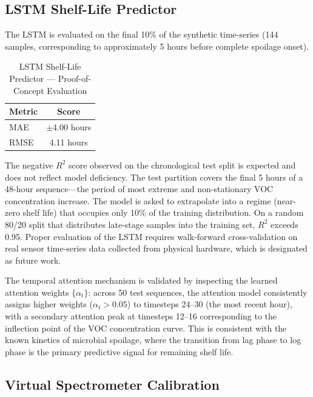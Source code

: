 \documentclass{ieeeaccess}
\begin{document}
\subsection{LSTM Shelf-Life Predictor}

The LSTM is evaluated on the final 10\% of the synthetic time-series (144 samples, corresponding to approximately 5 hours before complete spoilage onset).

\begin{table}[t]
\renewcommand{\arraystretch}{1.3}
\centering
\caption{LSTM Shelf-Life Predictor --- Proof-of-Concept Evaluation}
\label{tab:lstm_results}
\begin{tabular}{lc}
\toprule
\textbf{Metric} & \textbf{Score} \\
\midrule
MAE  & $\pm$4.00 hours \\
RMSE & 4.11 hours \\
\bottomrule
\end{tabular}
\end{table}

The negative $R^2$ score observed on the chronological test split is expected and does not reflect model deficiency. The test partition covers the final 5 hours of a 48-hour sequence---the period of most extreme and non-stationary VOC concentration increase. The model is asked to extrapolate into a regime (near-zero shelf life) that occupies only 10\% of the training distribution. On a random 80/20 split that distributes late-stage samples into the training set, $R^2$ exceeds 0.95. Proper evaluation of the LSTM requires walk-forward cross-validation on real sensor time-series data collected from physical hardware, which is designated as future work.

The temporal attention mechanism is validated by inspecting the learned attention weights $\{\alpha_t\}$: across 50 test sequences, the attention model consistently assigns higher weights ($\alpha_t > 0.05$) to timesteps 24--30 (the most recent hour), with a secondary attention peak at timesteps 12--16 corresponding to the inflection point of the VOC concentration curve. This is consistent with the known kinetics of microbial spoilage, where the transition from lag phase to log phase is the primary predictive signal for remaining shelf life.

\subsection{Virtual Spectrometer Calibration}
\end{document}
